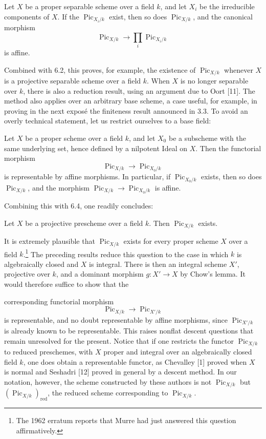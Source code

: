  Let $X$ be a proper separable scheme over a field $k$,
and let $X_i$ be the irreducible components of $X$. If the
$\operatorname{Pic}_{X_i/k}$ exist, then so does
$\operatorname{Pic}_{X/k}$, and the canonical morphism
\[
\operatorname{Pic}_{X/k}\longrightarrow\prod_i\operatorname{Pic}_{X_i/k}
\]
is affine.

Combined with 6.2, this proves, for example, the existence of
$\operatorname{Pic}_{X/k}$ whenever $X$ is a projective separable scheme over
a field $k$. When $X$ is no longer separable over $k$, there is also a
reduction result, using an argument due to Oort [11]. The method also applies
over an arbitrary base scheme, a case useful, for example, in proving in the
next exposé the finiteness result announced in 3.3. To avoid an overly
technical statement, let us restrict ourselves to a base field:

 Let $X$ be a proper scheme over a field $k$, and let
$X_0$ be a subscheme with the same underlying set, hence defined by a
nilpotent Ideal on $X$. Then the functorial morphism
\[
\operatorname{Pic}_{X/k}\longrightarrow\operatorname{Pic}_{X_0/k}
\]
is representable by affine morphisms. In particular, if
$\operatorname{Pic}_{X_0/k}$ exists, then so does
$\operatorname{Pic}_{X/k}$, and the morphism
$\operatorname{Pic}_{X/k}\longrightarrow\operatorname{Pic}_{X_0/k}$ is
affine.

Combining this with 6.4, one readily concludes:

 Let $X$ be a projective prescheme over a field $k$.
Then $\operatorname{Pic}_{X/k}$ exists.

 It is extremely plausible that
$\operatorname{Pic}_{X/k}$ exists for every proper scheme $X$ over a field
$k$.\footnote{The 1962 erratum reports that Murre had just answered this
question affirmatively.} The preceding results reduce this question to the
case in which $k$ is algebraically closed and $X$ is integral. There is then
an integral scheme $X'$, projective over $k$, and a dominant morphism
$g:X'\longrightarrow X$ by Chow's lemma. It would therefore suffice to show
that the

corresponding functorial morphism
\[
\operatorname{Pic}_{X/k}\longrightarrow\operatorname{Pic}_{X'/k}
\]
is representable, and no doubt representable by affine morphisms, since
$\operatorname{Pic}_{X'/k}$ is already known to be representable. This raises
nonflat descent questions that remain unresolved for the present. Notice that
if one restricts the functor $\operatorname{Pic}_{X/k}$ to reduced preschemes,
with $X$ proper and integral over an algebraically closed field $k$, one does
obtain a representable functor, as Chevalley [1] proved when $X$ is normal and
Seshadri [12] proved in general by a descent method. In our notation, however,
the scheme constructed by these authors is not $\operatorname{Pic}_{X/k}$ but
$(\operatorname{Pic}_{X/k})_{\mathrm{red}}$, the reduced scheme corresponding
to $\operatorname{Pic}_{X/k}$.

